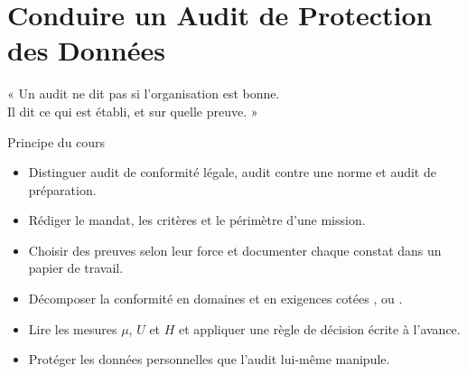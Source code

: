 
\chapter{Conduire un Audit de Protection des Données}
\label{chap:audit}

\epigraph{%
    « Un audit ne dit pas si l'organisation est bonne.\\
    Il dit ce qui est établi, et sur quelle preuve. »%
}{Principe du cours}


\begin{boxobjectifs}
\begin{itemize}
    \item Distinguer audit de conformité légale, audit contre une norme et
          audit de préparation.
    \item Rédiger le mandat, les critères et le périmètre d'une mission.
    \item Choisir des preuves selon leur force et documenter chaque constat
          dans un papier de travail.
    \item Décomposer la conformité en domaines et en exigences cotées
          \OUI{}, \NON{} ou \NEK{}.
    \item Lire les mesures $\mu$, $U$ et $H$ et appliquer une règle de
          décision écrite à l'avance.
    \item Protéger les données personnelles que l'audit lui-même manipule.
\end{itemize}
\end{boxobjectifs}

